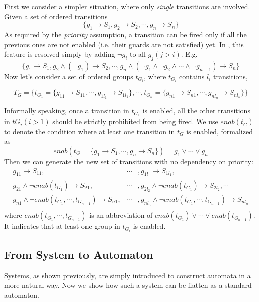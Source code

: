  First we consider a simpler situation, where only \emph{single} transitions are involved. Given a set of ordered transitions
\[
    \{g_1\rightarrow S_1,g_2\rightarrow S_2,\cdots,g_n\rightarrow S_n\}
\]
As required by the \emph{priority} assumption, a transition can be fired only if all the previous ones are not enabled (i.e. their guards are not satisfied) yet. In \lang{}, this feature is resolved simply by adding $\lnot g_i$ to all $g_j(j>i)$. E.g.
\[
    \{g_1\rightarrow S_1, g_2\land(\lnot g_1)\rightarrow S_2,\cdots,g_n\land(\lnot g_1\land \lnot g_2\land\cdots\land \lnot g_{n-1})\rightarrow S_n\}
\]
Now let's consider a set of ordered groups $t_{G_i}$, where $t_{G_i}$ contains $l_i$ transitions,
\begin{small}
\[
    T_G=\{t_{G_1}=\{g_{11}\rightarrow S_{11},\cdots, g_{1l_1}\rightarrow S_{1l_1}\},\cdots,t_{G_n}=\{g_{n1}\rightarrow S_{n1},\cdots,g_{nl_n}\rightarrow S_{nl_n}\}\}
\]
\end{small}
Informally speaking, once a transition in $t_{G_1}$ is enabled, all the other transitions in $t{G_i}(i>1)$ should be strictly prohibited from being fired. We use $enab(t_G)$ to denote the condition where at least one transition in $t_G$ is enabled, formalized as
\[
    enab(t_G=\{g_1\rightarrow S_1,\cdots, g_n\rightarrow S_n\}) = g_1\lor\cdots\lor g_n
\]
Then we can generate the new set of transitions with no dependency on priority:
\begin{eqnarray*}
    g_{11}\rightarrow S_{11},&\cdots&,g_{1l_1}\rightarrow S_{1l_1}, \\
    g_{21}\land \lnot enab(t_{G_1})\rightarrow S_{21}, &\cdots&, g_{2l_2} \land \lnot enab(t_{G_1})\rightarrow S_{2l_2}, \cdots \\
    g_{n1}\land \lnot enab(t_{G_1},\cdots,t_{G_{n-1}})\rightarrow S_{n1}, &\cdots&, g_{nl_n} \land \lnot enab(t_{G_1},\cdots,t_{G_{n-1}})\rightarrow S_{nl_n} \\
\end{eqnarray*}
where $enab(t_{G_1},\cdots,t_{G_{n-1}})$ is an abbreviation of $enab(t_{G_1})\lor\cdots\lor enab(t_{G_{n-1}})$. It indicates that at least one group in $t_{G_i}$ is enabled.
\subsection{From System to Automaton}
\label{subsec:composition}

Systems, as shown previously, are simply introduced to construct automata in a more natural way. Now we show how such a system can be flatten as a standard automaton.

